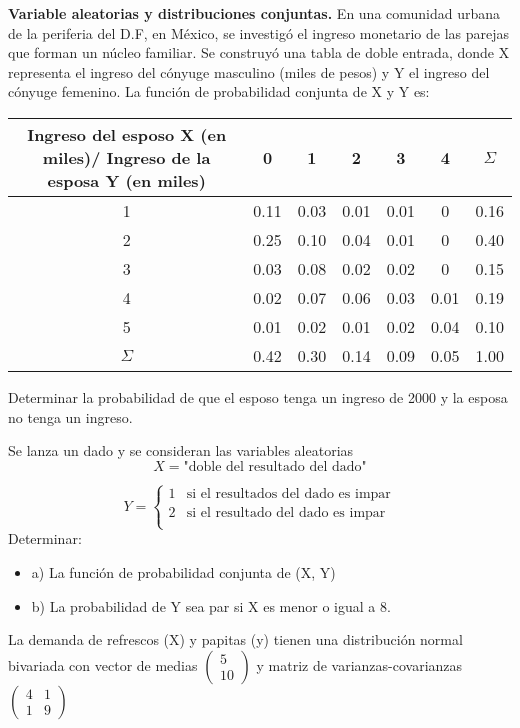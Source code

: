 \documentclass{../oxmathproblems}
\begin{document}
\begin{questions}

\miquestion \textbf {Variable aleatorias y distribuciones conjuntas.} En una comunidad urbana de la periferia del D.F, en México, se investigó el ingreso monetario de las parejas que forman un núcleo familiar. Se construyó una tabla de doble entrada, donde X representa el ingreso del cónyuge masculino (miles de pesos) y Y el ingreso del cónyuge femenino. 
La función de probabilidad conjunta de X y Y es: 

\begin{center}
\begin{tabular}{ |c|c|c|c|c|c|c| } 
\hline
Ingreso del esposo X (en miles)/ Ingreso de la esposa Y (en miles) & 0 & 1 & 2 & 3 & 4 & $\varSigma$ \\
\hline
1 & 0.11 & 0.03 & 0.01 & 0.01 & 0 & 0.16 \\
2 & 0.25 & 0.10 & 0.04 & 0.01 & 0 & 0.40 \\
3 & 0.03 & 0.08 & 0.02 & 0.02 & 0 & 0.15 \\
4 & 0.02 & 0.07 & 0.06 & 0.03 & 0.01 & 0.19  \\
5 & 0.01 & 0.02 & 0.01 & 0.02 & 0.04 & 0.10  \\
$\varSigma$ & 0.42 & 0.30 & 0.14 & 0.09 & 0.05 & 1.00  \\
\hline
\end{tabular}
\end{center}

Determinar la probabilidad de que el esposo tenga un ingreso de 2000 y la esposa no tenga un ingreso. 

\miquestion Se lanza un dado y se consideran las variables aleatorias
 $$ X = \text{"doble del resultado del dado"} $$
 
 \[   
Y = 
     \begin{cases}
       1 &  \text{si el resultados del dado es impar}\\
       2 & \text{si el resultado del dado es impar} \\
     \end{cases}
\]
$$$$
Determinar: 
\begin{itemize}
\item  a) La función de probabilidad conjunta de (X, Y)
\item  b) La probabilidad de Y sea par si X es menor o igual a 8. 
\end{itemize}

\miquestion La demanda de refrescos (X) y papitas (y) tienen una distribución normal bivariada con vector de medias $\begin{pmatrix}5 \\ 10 \end{pmatrix} $  y matriz de varianzas-covarianzas $\begin{pmatrix}4 & 1\\ 1 &9\end{pmatrix} $


\end{questions}
\end{document}
